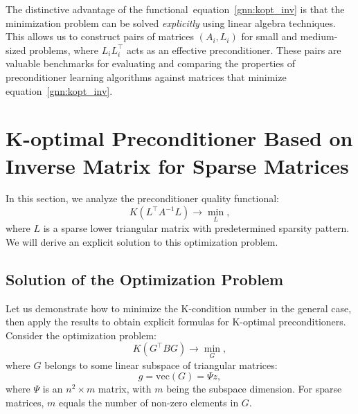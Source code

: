 \documentclass[10pt]{article} %
\def\eqref#1{equation~\ref{#1}}
\theoremstyle{plain}
\theoremstyle{definition}
\theoremstyle{remark}
\begin{document}
The distinctive advantage of the functional~\eqref{gnn:kopt_inv} is that the minimization problem can be solved \emph{explicitly} using linear algebra techniques. This allows us to construct pairs of matrices $(A_i, L_i)$ for small and medium-sized problems, where $L_i L^{\top}_i$ acts as an effective preconditioner. These pairs are valuable benchmarks for evaluating and comparing the properties of preconditioner learning algorithms against matrices that minimize \eqref{gnn:kopt_inv}.

\section{K-optimal Preconditioner Based on Inverse Matrix for Sparse Matrices}

In this section, we analyze the preconditioner quality functional:
\begin{equation}\label{prec:koptinv}
	K(L^{\top} A^{-1} L) \rightarrow \min_L,
\end{equation}
where $L$ is a sparse lower triangular matrix with predetermined sparsity pattern. We will derive an 
explicit solution to this optimization problem.

\subsection{Solution of the Optimization Problem}

Let us demonstrate how to minimize the K-condition number in the general case, 
then apply the results to obtain explicit formulas for K-optimal preconditioners. Consider the optimization problem:
\begin{equation}\label{prec:kinv}
	K(G^{\top} B G) \rightarrow \min_G,
\end{equation}
where $G$ belongs to some linear subspace of triangular matrices:
\begin{equation*}
	g = \mathrm{vec}(G) = \Psi z,
\end{equation*}
where $\Psi$ is an $n^2 \times m$ matrix, with $m$ being the subspace dimension. For sparse matrices, 
$m$ equals the number of non-zero elements in $G$.
\end{document}
